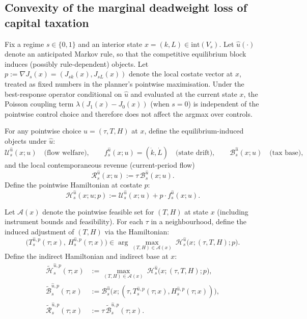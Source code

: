 \documentclass{article}
\begin{document}
\subsection{Convexity of the marginal deadweight loss of capital taxation}\label{subsec:lemma_DWLH}

Fix a regime $s\in\{0,1\}$ and an interior state $x=(k,L)\in\mathrm{int}(V_s)$. Let $\hat u(\cdot)$ denote an
anticipated Markov rule, so that the competitive equilibrium block induces (possibly rule-dependent) objects.
Let $p:=\nabla J_s(x)=(J_{sk}(x),J_{sL}(x))$ denote the local costate vector at $x$, treated as fixed numbers in the
planner's pointwise maximisation. Under the best-response operator conditional on $\hat u$ and evaluated at the current
state $x$, the Poisson coupling term $\lambda(J_1(x)-J_0(x))$ (when $s=0$) is independent of the pointwise control choice
and therefore does not affect the argmax over controls.

For any pointwise choice $u=(\tau,T,H)$ at $x$, define the equilibrium-induced objects under $\hat u$:
\[
\mathcal U_s^{\hat u}(x;u)
\quad\text{(flow welfare)},\qquad
f_s^{\hat u}(x;u)=(\dot k,\dot L)
\quad\text{(state drift)},\qquad
\mathcal B_s^{\hat u}(x;u)
\quad\text{(tax base)},
\]
and the local contemporaneous revenue (current-period flow)
\[
\mathcal R_s^{\hat u}(x;u):=\tau\,\mathcal B_s^{\hat u}(x;u).
\]
Define the pointwise Hamiltonian at costate $p$:
\[
\mathcal H_s^{\hat u}(x;u;p):=\mathcal U_s^{\hat u}(x;u)+p\cdot f_s^{\hat u}(x;u).
\]

Let $\mathcal A(x)$ denote the pointwise feasible set for $(T,H)$ at state $x$ (including instrument bounds and feasibility).
For each $\tau$ in a neighbourhood, define the induced adjustment of $(T,H)$ via the Hamiltonian:
\[
\big(T_s^{\hat u,p}(\tau;x),\,H_s^{\hat u,p}(\tau;x)\big)\in
\arg\max_{(T,H)\in\mathcal A(x)} \ \mathcal H_s^{\hat u}\big(x;(\tau,T,H);p\big).
\]
Define the indirect Hamiltonian and indirect base at $x$:
\begin{align*}
\widetilde{\mathcal H}_s^{\hat u,p}(\tau;x)
&:=\max_{(T,H)\in\mathcal A(x)} \ \mathcal H_s^{\hat u}\big(x;(\tau,T,H);p\big),\\
\widetilde{\mathcal B}_s^{\hat u,p}(\tau;x)
&:=\mathcal B_s^{\hat u}\big(x;(\tau,T_s^{\hat u,p}(\tau;x),H_s^{\hat u,p}(\tau;x))\big),\\
\widetilde{\mathcal R}_s^{\hat u,p}(\tau;x)
&:=\tau\,\widetilde{\mathcal B}_s^{\hat u,p}(\tau;x).
\end{align*}
\end{document}
